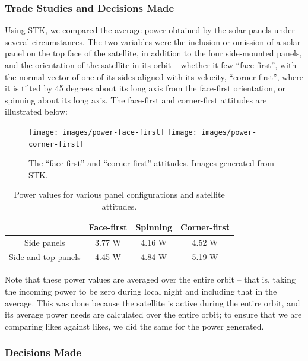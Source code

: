 \documentclass[12pt]{article}
\begin{document}
			\subsubsection{Trade Studies and Decisions Made}
			Using STK, we compared the average power obtained by the solar panels under several circumstances.  The two variables were the inclusion or omission of a solar panel on the top face of the satellite, in addition to the four side-mounted panels, and the orientation of the satellite in its orbit -- whether it few ``face-first'', with the normal vector of one of its sides aligned with its velocity, ``corner-first'', where it is tilted by 45 degrees about its long axis from the face-first orientation, or spinning about its long axis.  The face-first and corner-first attitudes are illustrated below:
			
			\begin{figure}[ht]%
			\centering
			\texttt{[image: images/power-face-first]}%
			\hspace{0.5in}
			\texttt{[image: images/power-corner-first]}
			\caption{The ``face-first'' and ``corner-first'' attitudes.  Images generated from STK.}%
			\label{fig:power-face-first}%
			\end{figure}
			
			\begin{table}[ht]\label{table:power-trade-study}
\caption{Power values for various panel configurations and satellite attitudes.}
\begin{center}
    \begin{tabular}{|c|c|c|c|} \hline
    	 & Face-first & Spinning & Corner-first \\ \hline
Side panels & 3.77 W & 4.16 W & 4.52 W \\\hline
Side and top panels & 4.45 W & 4.84 W & 5.19 W \\\hline
    \end{tabular}
\end{center}
\end{table}

Note that these power values are averaged over the entire orbit -- that is, taking the incoming power to be zero during local night and including that in the average.  This was done because the satellite is active during the entire orbit, and its average power needs are calculated over the entire orbit; to ensure that we are comparing likes against likes, we did the same for the power generated.
			
			\subsubsection{Decisions Made}
			
\end{document}
